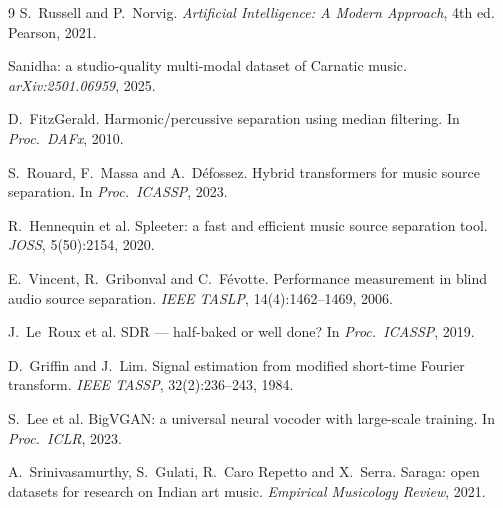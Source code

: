 \documentclass[11pt,a4paper,twocolumn]{article}
\begin{document}
\begin{thebibliography}{9}
\small
{}
S.~Russell and P.~Norvig.
\newblock \emph{Artificial Intelligence: A Modern Approach}, 4th ed. Pearson, 2021.

Sanidha: a studio-quality multi-modal dataset of Carnatic music. \emph{arXiv:2501.06959}, 2025.

D.~FitzGerald. Harmonic/percussive separation using median filtering. In \emph{Proc.\ DAFx}, 2010.

S.~Rouard, F.~Massa and A.~D\'efossez. Hybrid transformers for music source separation. In
\emph{Proc.\ ICASSP}, 2023.

R.~Hennequin et al. Spleeter: a fast and efficient music source separation tool. \emph{JOSS},
5(50):2154, 2020.

E.~Vincent, R.~Gribonval and C.~F\'evotte. Performance measurement in blind audio source
separation. \emph{IEEE TASLP}, 14(4):1462--1469, 2006.

J.~Le~Roux et al. SDR --- half-baked or well done? In \emph{Proc.\ ICASSP}, 2019.

D.~Griffin and J.~Lim. Signal estimation from modified short-time Fourier transform. \emph{IEEE
TASSP}, 32(2):236--243, 1984.

S.~Lee et al. BigVGAN: a universal neural vocoder with large-scale training. In \emph{Proc.\
ICLR}, 2023.

A.~Srinivasamurthy, S.~Gulati, R.~Caro Repetto and X.~Serra. Saraga: open datasets for research on
Indian art music. \emph{Empirical Musicology Review}, 2021.
\end{thebibliography}
\end{document}
